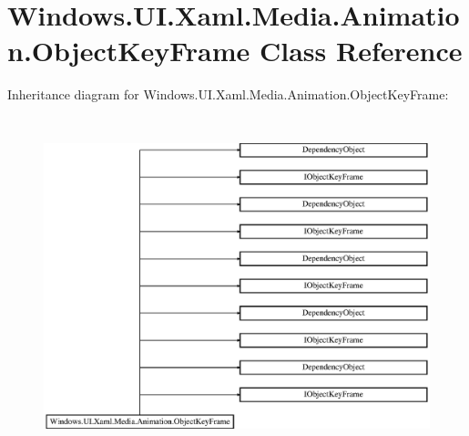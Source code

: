 \hypertarget{class_windows_1_1_u_i_1_1_xaml_1_1_media_1_1_animation_1_1_object_key_frame}{}\section{Windows.\+U\+I.\+Xaml.\+Media.\+Animation.\+Object\+Key\+Frame Class Reference}
\label{class_windows_1_1_u_i_1_1_xaml_1_1_media_1_1_animation_1_1_object_key_frame}
Inheritance diagram for Windows.\+U\+I.\+Xaml.\+Media.\+Animation.\+Object\+Key\+Frame\+:\begin{figure}[H]
\begin{center}
\leavevmode
\includegraphics[height=9.808917cm]{class_windows_1_1_u_i_1_1_xaml_1_1_media_1_1_animation_1_1_object_key_frame}
\end{center}
\end{figure}
